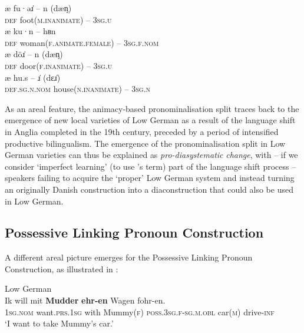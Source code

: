 \documentclass[output=paper]{langsci/langscibook}
\begin{document}
	\ex\label{ex:hoeder:14b}	
	\gll æ fu·əɹ̇ – n (dæᶇ)\\
     \textsc{def}{} foot(\textsc{m.inanimate}) – 3\textsc{sg.u}\\

	\ex\label{ex:hoeder:14c}	
	\gll æ ku·n – hᴕn\\
     \textsc{def} woman(\textsc{f.animate.female}) – 3\textsc{sg.f.nom}\\

	\ex\label{ex:hoeder:14d}	
	\gll æ döɹ̇ – n (dæᶇ)\\
     \textsc{def}{} door(\textsc{f.inanimate}) – 3\textsc{sg.u}\\

	\ex\label{ex:hoeder:14e}	
	\gll æ hu.s – ɹ̇ (dɛɹ̇)\\
     \textsc{def.sg.n.nom}{} house(\textsc{n.inanimate}) – 3\textsc{sg.n}\\
\z
\z

As an areal feature, the animacy-based pronominalisation split traces back to the emergence of new local varieties of Low German as a result of the language shift in Anglia completed in the 19th century, preceded by a period of intensified productive bilingualism. The{} emergence of the pronominalisation split in Low German varieties can thus be explained as \textit{pro-diasystematic} \textit{change}, with – if we consider ‘imperfect learning’ (to use \citeauthor{Thomason.1988}'s \citeyear{Thomason.1988} term) part of the language shift process – speakers failing to acquire the ‘proper’ Low German system and instead turning an originally Danish construction into a diaconstruction that could also be used in Low German.


 
\subsection{Possessive Linking Pronoun Construction}\label{sec:hoeder:4.5}


A different areal picture emerges for the Possessive Linking Pronoun Construction, as illustrated in :
 
\ea\label{ex:hoeder:15}
	\ea\label{ex:hoeder:15a}
	Low German\\
	\gll Ik will mit \textbf{Mudder}{ }\textbf{ehr-en} Wagen fohr-en.\\
     \textsc{1sg.nom}{} want.\textsc{prs.1sg} with Mummy(\textsc{f}) \textsc{poss.3sg.f-sg.m.obl} car(\textsc{m}) drive-\textsc{inf}\\
	\glt `I want to take Mummy’s car.'
\end{document}
